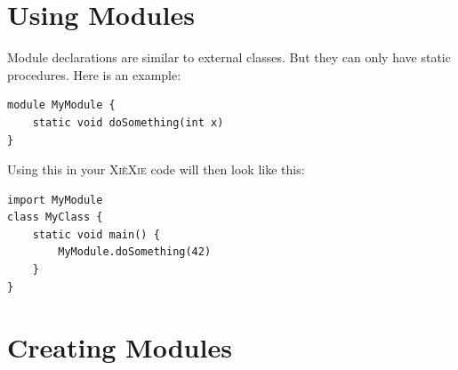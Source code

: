 \documentclass[a5paper]{report}
\def\xiexie{\textsc{Xi\`eXie}\xspace}
\begin{document}

\section{Using Modules}

Module declarations are similar to external classes. But they can only have static procedures. Here is an example:
\begin{lstlisting}
module MyModule {
    static void doSomething(int x)
}
\end{lstlisting}
Using this in your \xiexie code will then look like this:
\begin{lstlisting}
import MyModule
class MyClass {
    static void main() {
        MyModule.doSomething(42)
    }
}
\end{lstlisting}



\section{Creating Modules}
\end{document}
